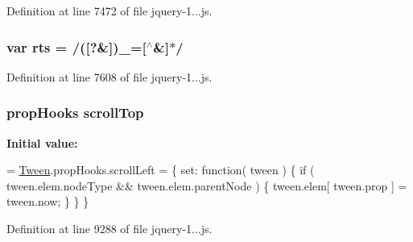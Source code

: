 Definition at line 7472 of file jquery-\/1...\+js.

\subsubsection[{\texorpdfstring{rts}{rts}}]{\setlength{\rightskip}{0pt plus 5cm}var rts = /(\mbox{[}?\&\mbox{]})\+\_\+=\mbox{[}$^\wedge$\&\mbox{]}$\ast$/}\hypertarget{obj_2_release_2_package_2_package_tmp_2_scripts_2jquery-1_810_82_8js_a38ff30904f54277281a13514d7aea00d}{}\label{obj_2_release_2_package_2_package_tmp_2_scripts_2jquery-1_810_82_8js_a38ff30904f54277281a13514d7aea00d}


Definition at line 7608 of file jquery-\/1...\+js.

\subsubsection[{\texorpdfstring{scroll\+Top}{scrollTop}}]{ {\bf prop\+Hooks} scroll\+Top}\hypertarget{obj_2_release_2_package_2_package_tmp_2_scripts_2jquery-1_810_82_8js_a57beb1f611d6c8b84919b0f7d9e0e890}{}\label{obj_2_release_2_package_2_package_tmp_2_scripts_2jquery-1_810_82_8js_a57beb1f611d6c8b84919b0f7d9e0e890}
{\bfseries Initial value\+:}
\begin{DoxyCode}
= \hyperlink{obj_2_release_2_package_2_package_tmp_2_scripts_2jquery-1_810_82_8js_a91e55267cc469e865a6a7c6cfc51c7b1}{Tween}.propHooks.scrollLeft = \{
    \textcolor{keyword}{set}: \textcolor{keyword}{function}( tween ) \{
        \textcolor{keywordflow}{if} ( tween.elem.nodeType && tween.elem.parentNode ) \{
            tween.elem[ tween.prop ] = tween.now;
        \}
    \}
\}
\end{DoxyCode}


Definition at line 9288 of file jquery-\/1...\+js.

